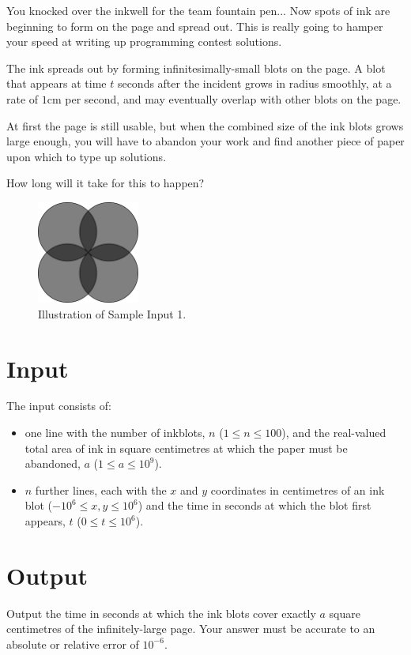 
You knocked over the inkwell for the team fountain pen... Now spots of ink are
beginning to form on the page and spread out. This is really going to hamper
your speed at writing up programming contest solutions.

The ink spreads out by forming infinitesimally-small blots on the page. A blot
that appears at time $t$ seconds after the incident grows in radius smoothly,
at a rate of $1$cm per second, and may eventually overlap with other blots on
the page.

At first the page is still usable, but when the combined size of the ink blots
grows large enough, you will have to abandon your work and find another piece
of paper upon which to type up solutions.

How long will it take for this to happen?

\begin{figure}[h!]
  \centering
  \includegraphics[width=0.3\textwidth]{sample1}
  \caption{Illustration of Sample Input 1.}
  \label{fig:knockedink}
\end{figure}

\section*{Input}

The input consists of:
\begin{itemize}
  \item one line with the number of inkblots, $n$ ($1 \le n \le 100$), and the
        real-valued total area of ink in square centimetres at which the paper
        must be abandoned, $a$ ($1 \le a \le 10^9$).
  \item $n$ further lines, each with the $x$ and $y$ coordinates in centimetres
        of an ink blot ($-10^6 \le x, y \le 10^6$) and the time in seconds at
        which the blot first appears, $t$ ($0 \le t \le 10^6$).
\end{itemize}

\section*{Output}

Output the time in seconds at which the ink blots cover exactly $a$ square
centimetres of the infinitely-large page.
Your answer must be accurate to an absolute or relative error of $10^{-6}$.
